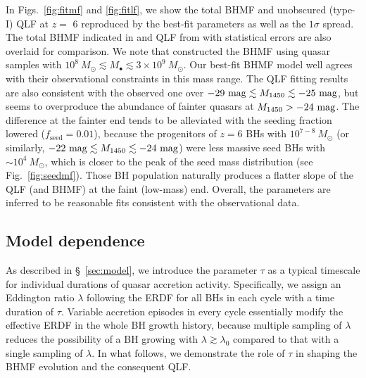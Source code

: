 \documentclass[twocolumn, twocolappendix]{aastex63}
\newcommand{\Msun}{M_\odot}
\newcommand{\Mbh}{M_\bullet}
\newcommand{\tlife}{\tau}
\newcommand{\fseed}{f_\mathrm{seed}}
\newcommand{\Muv}{M_{1450}}
\begin{document}
\begin{CJK*}{UTF8}{gbsn}
In Figs.~\ref{fig:fitmf} and \ref{fig:fitlf}, we show the total BHMF and unobscured (type-I) QLF at $z=$ 6 
reproduced by the best-fit parameters as well as the $1\sigma$ spread.
The total BHMF indicated in  and QLF from  
with statistical errors are also overlaid for comparison.
We note that  constructed the BHMF using quasar samples with 
$10^8~\Msun \lesssim \Mbh \lesssim 3\times 10^9~\Msun$.
Our best-fit BHMF model well agrees with their observational constraints in this mass range.
The QLF fitting results are also consistent with the observed one over $-29~{\rm mag} \lesssim \Muv \lesssim -25~{\rm mag}$,
but seems to overproduce the abundance of fainter quasars at $\Muv>-24~{\rm mag}$.
The difference at the fainter end tends to be alleviated with the seeding fraction lowered ($\fseed = 0.01$),
because the progenitors of $z=6$ BHs with $10^{7-8}~\Msun$ (or similarly, 
$-22~{\rm mag} \lesssim \Muv \lesssim -24~{\rm mag}$) were less massive seed BHs with $\sim 10^4~\Msun$,
which is closer to the peak of the seed mass distribution (see Fig.~\ref{fig:seedmf}).
Those BH population naturally produces a flatter slope of the QLF (and BHMF) at the faint (low-mass) end.
Overall, the parameters are inferred to be reasonable fits consistent with the observational data.



\vspace{2mm}
\subsection{Model dependence}\label{sec:modep}
As described in \S~\ref{sec:model}, we introduce the parameter $\tau$ as a typical timescale
for individual durations of quasar accretion activity.
Specifically, we assign an Eddington ratio $\lambda$ following the ERDF for all BHs in each cycle
with a time duration of $\tau$.
Variable accretion episodes in every cycle essentially modify the effective ERDF in the whole BH growth history,
because multiple sampling of $\lambda$ reduces the possibility of a BH growing with $\lambda \gtrsim \lambda_0$
compared to that with a single sampling of $\lambda$.
In what follows, we demonstrate the role of $\tlife$ in shaping the BHMF evolution and the consequent QLF.


\end{CJK*}
\end{document}
